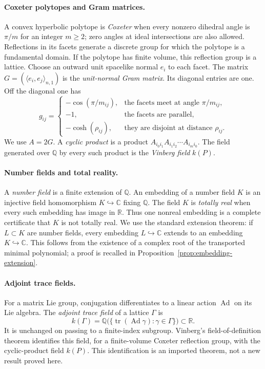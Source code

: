\documentclass[11pt]{article}
\numberwithin{equation}{section}
\theoremstyle{definition}
\theoremstyle{remark}
\newcommand{\Q}{\mathbb{Q}}
\newcommand{\R}{\mathbb{R}}
\newcommand{\C}{\mathbb{C}}
\newcommand{\tr}{\operatorname{tr}}
\newcommand{\Ad}{\operatorname{Ad}}
\begin{document}
\paragraph{Coxeter polytopes and Gram matrices.}
A convex hyperbolic polytope is \emph{Coxeter} when every nonzero dihedral
angle is \(\pi/m\) for an integer \(m\ge2\); zero angles at ideal intersections
are also allowed.  Reflections in its facets generate a
discrete group for which the polytope is a fundamental domain.  If the
polytope has finite volume, this reflection group is a lattice.  Choose an
outward unit spacelike normal \(e_i\) to each facet.  The matrix
\(G=(\langle e_i,e_j\rangle_{n,1})\) is the \emph{unit-normal Gram matrix}.
Its diagonal entries are one.  Off the diagonal one has
\[
 g_{ij}=
 \begin{cases}
 -\cos(\pi/m_{ij}),&\text{the facets meet at angle }\pi/m_{ij},\\
 -1,&\text{the facets are parallel},\\
 -\cosh(\rho_{ij}),&\text{they are disjoint at distance }\rho_{ij}.
 \end{cases}
\]
We use \(A=2G\).  A \emph{cyclic product} is a product
\(A_{i_0i_1}A_{i_1i_2}\cdots A_{i_mi_0}\).  The field generated over \(\Q\)
by every such product is the \emph{Vinberg field} \(k(P)\).

\paragraph{Number fields and total reality.}
A \emph{number field} is a finite extension of \(\Q\).  An embedding of a
number field \(K\) is an injective field homomorphism \(K\hookrightarrow\C\)
fixing \(\Q\).  The field \(K\) is \emph{totally real} when every such
embedding has image in \(\R\).  Thus one nonreal embedding is a complete
certificate that \(K\) is not totally real.  We use the standard extension
theorem: if \(L\subset K\) are number fields, every embedding
\(L\hookrightarrow\C\) extends to an embedding \(K\hookrightarrow\C\).
This follows from the existence of a complex root of the transported minimal
polynomial; a proof is recalled in Proposition~\ref{prop:embedding-extension}.

\paragraph{Adjoint trace fields.}
For a matrix Lie group, conjugation differentiates to a linear action
\(\Ad\) on its Lie algebra.  The \emph{adjoint trace field} of a lattice
\(\Gamma\) is
\[
 k(\Gamma)=
 \Q\bigl(\{\tr(\Ad\gamma):\gamma\in\Gamma\}\bigr)\subset\R.
\]
It is unchanged on passing to a finite-index subgroup.  Vinberg's
field-of-definition theorem identifies this field, for a finite-volume
Coxeter reflection group, with the cyclic-product field \(k(P)\).  This
identification is an imported theorem, not a new result proved here.
\end{document}
